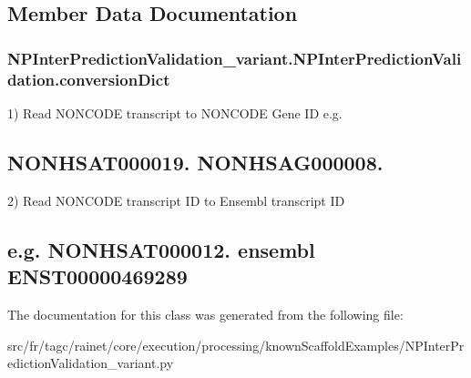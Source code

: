 \subsection{Member Data Documentation}
\hypertarget{classNPInterPredictionValidation__variant_1_1NPInterPredictionValidation_a3510e05a9821aaac2b60e6cf1cf85657}{
\subsubsection[{conversion\-Dict}]{\setlength{\rightskip}{0pt plus 5cm}N\-P\-Inter\-Prediction\-Validation\-\_\-variant.\-N\-P\-Inter\-Prediction\-Validation.\-conversion\-Dict}}\label{classNPInterPredictionValidation__variant_1_1NPInterPredictionValidation_a3510e05a9821aaac2b60e6cf1cf85657}


1) Read N\-O\-N\-C\-O\-D\-E transcript to N\-O\-N\-C\-O\-D\-E Gene I\-D e.\-g. 

\subsection*{N\-O\-N\-H\-S\-A\-T000019. N\-O\-N\-H\-S\-A\-G000008. }

2) Read N\-O\-N\-C\-O\-D\-E transcript I\-D to Ensembl transcript I\-D \subsection*{e.\-g. N\-O\-N\-H\-S\-A\-T000012. ensembl E\-N\-S\-T00000469289 }

The documentation for this class was generated from the following file\-:\begin{DoxyCompactItemize}
\item 
src/fr/tagc/rainet/core/execution/processing/known\-Scaffold\-Examples/N\-P\-Inter\-Prediction\-Validation\-\_\-variant.\-py\end{DoxyCompactItemize}
